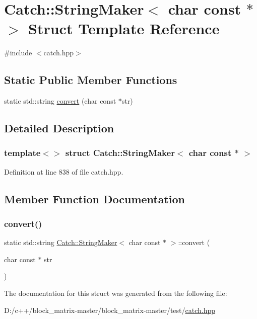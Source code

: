 \hypertarget{struct_catch_1_1_string_maker_3_01char_01const_01_5_01_4}{}\section{Catch\+:\+:String\+Maker$<$ char const $\ast$ $>$ Struct Template Reference}
\label{struct_catch_1_1_string_maker_3_01char_01const_01_5_01_4}


{\ttfamily \#include $<$catch.\+hpp$>$}

\subsection*{Static Public Member Functions}
\begin{DoxyCompactItemize}
\item 
static std\+::string \mbox{\hyperlink{struct_catch_1_1_string_maker_3_01char_01const_01_5_01_4_a20813965ad59cdf6d1f874f47158432d}{convert}} (char const $\ast$str)
\end{DoxyCompactItemize}


\subsection{Detailed Description}
\subsubsection*{template$<$$>$\newline
struct Catch\+::\+String\+Maker$<$ char const $\ast$ $>$}



Definition at line 838 of file catch.\+hpp.



\subsection{Member Function Documentation}
\mbox{\label{struct_catch_1_1_string_maker_3_01char_01const_01_5_01_4_a20813965ad59cdf6d1f874f47158432d}} 
\subsubsection{\texorpdfstring{convert()}{convert()}}
{\footnotesize\ttfamily static std\+::string \mbox{\hyperlink{struct_catch_1_1_string_maker}{Catch\+::\+String\+Maker}}$<$ char const $\ast$ $>$\+::convert (\begin{DoxyParamCaption}\item[{char const $\ast$}]{str }\end{DoxyParamCaption})\hspace{0.3cm}{\ttfamily [static]}}



The documentation for this struct was generated from the following file\+:\begin{DoxyCompactItemize}
\item 
D\+:/c++/block\+\_\+matrix-\/master/block\+\_\+matrix-\/master/test/\mbox{\hyperlink{catch_8hpp}{catch.\+hpp}}\end{DoxyCompactItemize}
